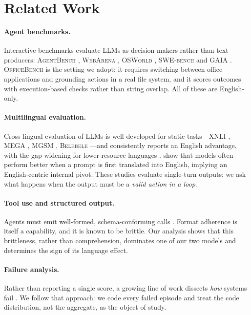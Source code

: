 \documentclass[11pt]{article}
\begin{document}
\section{Related Work}

\paragraph{Agent benchmarks.} Interactive benchmarks evaluate LLMs as decision makers rather
than text producers: \textsc{AgentBench} \citep{liu2023agentbench}, \textsc{WebArena}
\citep{zhou2024webarena}, \textsc{OSWorld} \citep{xie2024osworld}, \textsc{SWE-bench}
\citep{jimenez2024swebench} and \textsc{GAIA} \citep{mialon2024gaia}. \textsc{OfficeBench}
\citep{wang2024officebench} is the setting we adopt: it requires switching between office
applications and grounding actions in a real file system, and it scores outcomes with
execution-based checks rather than string overlap. All of these are English-only.

\paragraph{Multilingual evaluation.} Cross-lingual evaluation of LLMs is well developed for
static tasks---\textsc{XNLI} \citep{conneau2018xnli}, \textsc{MEGA} \citep{ahuja2023mega},
\textsc{MGSM} \citep{shi2023mgsm}, \textsc{Belebele} \citep{bandarkar2024belebele}---and
consistently reports an English advantage, with the gap widening for lower-resource languages
\citep{huang2023notall,zhang2023dont}. \citet{etxaniz2024multilingual} show that models often
perform better when a prompt is first translated into English, implying an English-centric
internal pivot. These studies evaluate single-turn outputs; we ask what happens when the output
must be a \emph{valid action in a loop}.

\paragraph{Tool use and structured output.} Agents must emit well-formed, schema-conforming
calls \citep{schick2023toolformer,qin2024toolllm,patil2024gorilla}. Format adherence is itself a
capability, and it is known to be brittle. Our analysis shows that this brittleness, rather than
comprehension, dominates one of our two models and determines the sign of its language effect.

\paragraph{Failure analysis.} Rather than reporting a single score, a growing line of work
dissects \emph{how} systems fail \citep{bang2023multitask}. We follow that approach: we code
every failed episode and treat the code distribution, not the aggregate, as the object of study.
\end{document}

